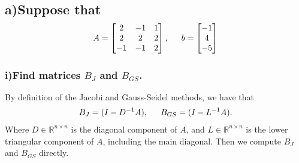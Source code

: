 \documentclass[11pt, letterpaper]{article}
\begin{document}
\subsection*{a)\normalfont Suppose that 
\begin{align*}
    A=
    \begin{bmatrix}
        2 & -1 & 1\\
        2 & 2 & 2\\
        -1 & -1 & 2
    \end{bmatrix}  
    ,\indent b=
    \begin{bmatrix}
        -1\\
        4\\
        -5
    \end{bmatrix} 
\end{align*}
}
\subsubsection*{i)\normalfont Find matrices $B_J$ and $B_{GS}$.}
By definition of the Jacobi and Gauss-Seidel methods, we have that
\begin{align*}
    B_J=(I-D^{-1}A),\indent B_{GS}=(I-L^{-1}A).
\end{align*}
Where $D\in\mathbb{R}^{n\times n}$ is the diagonal component of $A$, and $L\in\mathbb{R}^{n\times n}$
is the lower triangular component of $A$, including the main diagonal. Then we compute $B_J$ and $B_{GS}$
directly.
\end{document}
